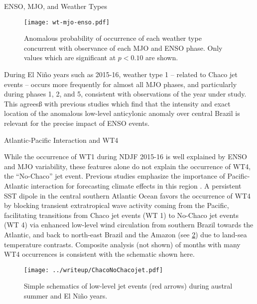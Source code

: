 \begin{block}{ENSO, MJO, and Weather Types}
  \begin{mdframed}
  \begin{figure}
    \caption{
  		Anomalous probability of occurrence of each weather type concurrent with observance of each MJO and ENSO phase.
  		Only values which are significant at $p<0.10$ are shown.
      \label{fig:wt-mjo-enso}
  	}
  	\noindent\texttt{[image: wt-mjo-enso.pdf]}
  \end{figure}
  \end{mdframed}

  During El Ni\~{n}o years such as 2015-16, weather type 1 -- related to Chaco jet events -- occurs more frequently for almost all MJO phases, and particularly during phases 1, 2, and 5, consistent with observations of the year under study.
  This agreesß with previous studies \cite[i.e.][]{Velasco1987} which find that the intensity and exact location of the anomalous low-level anticylonic anomaly over central Brazil is relevant for the precise impact of ENSO events.

\end{block}
\vfill
\begin{block}{Atlantic-Pacific Interaction and WT4}

  While the occurrence of WT1 during NDJF 2015-16 is well explained by ENSO and MJO variability, these features alone do not explain the occurrence of WT4, the ``No-Chaco'' jet event.
  Previous studies emphasize the importance of Pacific-Atlantic interaction for forecasting climate effects in this region \cite{Vera:2006ib,Barreiro:2017ct,Lima:2017hw,Munoz2015}.
  A persistent SST dipole in the central southern Atlantic Ocean favors the occurrence of WT4 by blocking transient extratropical wave activity coming from the Pacific, facilitating transitions from Chaco jet events (WT 1) to No-Chaco jet events (WT 4) via enhanced low-level wind circulation from southern Brazil towards the Atlantic, and back to north-east Brazil and the Amazon (see \cref{fig:chaco-nochaco}) due to land-sea temperature contrasts.
  Composite analysis (not shown) of months with many WT4 occurrences is consistent with the schematic shown here.

  \begin{mdframed}
  \begin{figure}
  	\noindent\texttt{[image: ../writeup/ChacoNoChacojet.pdf]}
    \caption{
      Simple schematics of low-level jet events (red arrows) during austral summer and El Ni\~no years.
      \label{fig:chaco-nochaco}
  	}

  \end{figure}
  \end{mdframed}
\end{block}
